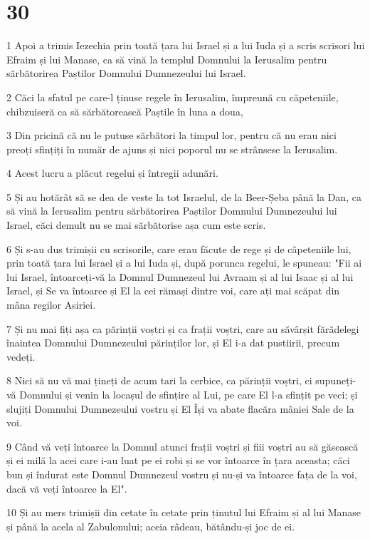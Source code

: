 \chapter{30}

\par 1 Apoi a trimis Iezechia prin toată țara lui Israel și a lui Iuda și a scris scrisori lui Efraim și lui Manase, ca să vină la templul Domnului la Ierusalim pentru sărbătorirea Paștilor Domnului Dumnezeului lui Israel.
\par 2 Căci la sfatul pe care-l ținuse regele în Ierusalim, împreună cu căpeteniile, chibzuiseră ca să sărbătorească Paștile în luna a doua,
\par 3 Din pricină că nu le putuse sărbători la timpul lor, pentru că nu erau nici preoți sfințiți în număr de ajuns și nici poporul nu se strânsese la Ierusalim.
\par 4 Acest lucru a plăcut regelui și întregii adunări.
\par 5 Și au hotărât să se dea de veste la tot Israelul, de la Beer-Șeba până la Dan, ca să vină la Ierusalim pentru sărbătorirea Paștilor Domnului Dumnezeului lui Israel, căci demult nu se mai sărbătorise așa cum este scris.
\par 6 Și s-au dus trimișii cu scrisorile, care erau făcute de rege și de căpeteniile lui, prin toată țara lui Israel și a lui Iuda și, după porunca regelui, le spuneau: "Fii ai lui Israel, întoarceți-vă la Domnul Dumnezeul lui Avraam și al lui Isaac și al lui Israel, și Se va întoarce și El la cei rămași dintre voi, care ați mai scăpat din mâna regilor Asiriei.
\par 7 Și nu mai fiți așa ca părinții voștri și ca frații voștri, care au săvârșit fărădelegi înaintea Domnului Dumnezeului părinților lor, și El i-a dat pustiirii, precum vedeți.
\par 8 Nici să nu vă mai țineți de acum tari la cerbice, ca părinții voștri, ci supuneți-vă Domnului și venin la locașul de sfințire al Lui, pe care El l-a sfințit pe veci; și slujiți Domnului Dumnezeului vostru și El Își va abate flacăra mâniei Sale de la voi.
\par 9 Când vă veți întoarce la Domnul atunci frații voștri și fiii voștri au să găsească și ei milă la acei care i-au luat pe ei robi și se vor întoarce în țara aceasta; căci bun și îndurat este Domnul Dumnezeul vostru și nu-și va întoarce fața de la voi, dacă vă veți întoarce la El".
\par 10 Și au mers trimișii din cetate în cetate prin ținutul lui Efraim și al lui Manase și până la acela al Zabulonului; aceia râdeau, bătându-și joc de ei.
